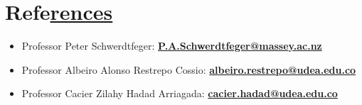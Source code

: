 \section{Refe\href{.}{rences}}



\begin{itemize}
    \small
    \itemsep0em
    \item Professor Peter Schwerdtfeger:
          \textbf{\url{P.A.Schwerdtfeger@massey.ac.nz}}
    \item Professor Albeiro Alonso Restrepo Cossio:
          \textbf{\url{albeiro.restrepo@udea.edu.co}}
    \item Professor Cacier Zilahy Hadad Arriagada:
          \textbf{\url{cacier.hadad@udea.edu.co}}
\end{itemize}